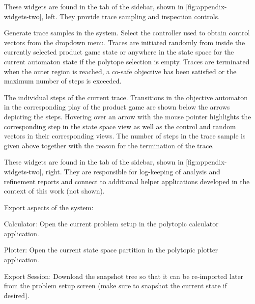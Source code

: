 \startsubject[title=Control Widgets]

    These widgets are found in the  tab of the sidebar, shown in [fig:appendix-widgets-two], left.
    They provide trace sampling and inspection controls.

    \startsubsubject[title={Widget: Sample Trace}]

        Generate trace samples in the system.
        Select the controller used to obtain control vectors from the dropdown menu.
        Traces are initiated randomly from inside the currently selected product game state or anywhere in the state space for the current automaton state if the polytope selection is empty.
        Traces are terminated when the outer region is reached, a co-safe objective has been satisfied or the maximum number of steps is exceeded.

    \stopsubsubject

    \startsubsubject[title={Widget: Trace}]

        The individual steps of the current trace.
        Transitions in the objective automaton in the corresponding play of the product game are shown below the arrows depicting the steps.
        Hovering over an arrow with the mouse pointer highlights the corresponding step in the state space view as well as the control and random vectors in their corresponding views.
        The number of steps in the trace sample is given above together with the reason for the termination of the trace.

    \stopsubsubject

\stopsubject


\startsubject[title=Info Widgets]

    These widgets are found in the  tab of the sidebar, shown in [fig:appendix-widgets-two], right.
    They are responsible for log-keeping of analysis and refinement reports and connect to additional helper applications developed in the context of this work (not shown).

    \startsubsubject[title={Widget: Connectivity}]

        Export aspects of the system:

        \startitemize[packed]
            \item{Calculator: Open the current problem setup in the polytopic calculator application.}
            \item{Plotter: Open the current state space partition in the polytopic plotter application.}
            \item{Export Session: Download the snapshot tree so that it can be re-imported later from the problem setup screen (make sure to snapshot the current state if desired).}
        \stopitemize

